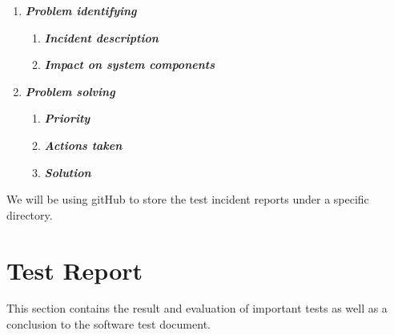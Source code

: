 \documentclass[12pt]{article}
\begin{document}
\begin{enumerate}
\def\labelenumi{\arabic{enumi}.}
\item
  \textbf{\emph{Problem identifying}}

  \begin{enumerate}
  \def\labelenumii{\arabic{enumii}.}
  \item
    \textbf{\emph{Incident description}}
  \item
    \textbf{\emph{Impact on system components}}
  \end{enumerate}
\item
  \textbf{\emph{Problem solving}}

  \begin{enumerate}
  \def\labelenumii{\arabic{enumii}.}
  \setcounter{enumii}{2}
  \item
    \textbf{\emph{Priority}}
  \item
    \textbf{\emph{Actions taken}}
  \item
    \textbf{\emph{Solution}}
  \end{enumerate}
\end{enumerate}

We will be using gitHub to store the test incident reports under a
specific directory.

\section{Test Report}\label{test-report}

This section contains the result and evaluation of important tests as
well as a conclusion to the software test document.
\end{document}
